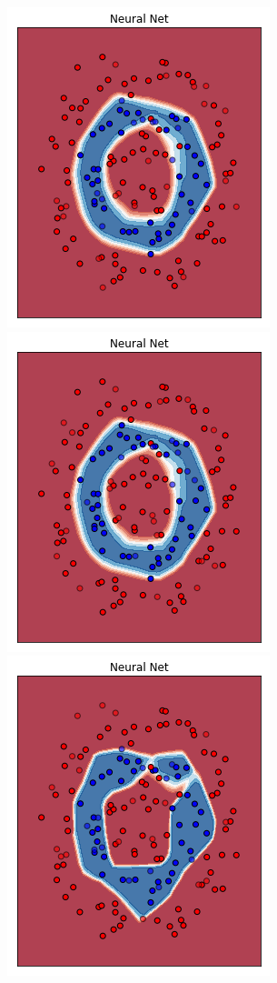 \documentclass[12pt,a4paper]{report}
\begin{document}
\begin{figure}[H]
 \includegraphics[scale = 0.35]{images/circle+-rnd-log./7}
 \includegraphics[scale = 0.35]{images/circle+-rnd-log./8}
 \\
 \includegraphics[scale = 0.35]{images/circle+-rnd-log./9}

\end{figure}
\end{document}
